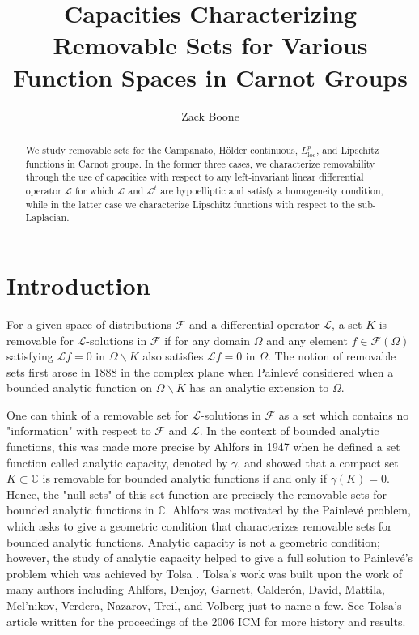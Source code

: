 \documentclass[12pt,a4paper,reqno]{amsart}
\title{Capacities Characterizing Removable Sets for Various Function Spaces in Carnot Groups}
\author{Zack Boone}
\renewcommand{\L}{\mathcal{L}}
\newcommand{\F}{\mathcal{F}}
\newcommand{\C}{\mathbb{C}}
\numberwithin{equation}{section}
\theoremstyle{definition}
\begin{document}
\begin{abstract}
We study removable sets for the Campanato, H\"{o}lder continuous, $L^p_{\text{loc}}$, and Lipschitz functions in Carnot groups. In the former three cases, we characterize removability through the use of capacities with respect to any left-invariant linear differential operator $\L$ for which $\L$ and $\L^t$ are hypoelliptic and satisfy a homogeneity condition, while in the latter case we characterize Lipschitz functions with respect to the sub-Laplacian.
\end{abstract}

\maketitle


\section{Introduction}
For a given space of distributions $\mathcal{F}$ and a differential operator $\L$, a set $K$ is removable for $\L$-solutions in $\mathcal{F}$ if for any domain $\Omega$ and any element $f \in \mathcal{F}(\Omega)$ satisfying $\L f = 0$ in $\Omega \backslash K$ also satisfies $\L f = 0$ in $\Omega$. The notion of removable sets first arose in 1888 in the complex plane when Painlev\'e considered when a bounded analytic function on $\Omega \backslash K$ has an analytic extension to $\Omega$. 

One can think of a removable set for $\L$-solutions in $\F$ as a set which contains no "information" with respect to $\mathcal{F}$ and $\L$. In the context of bounded analytic functions, this was made more precise by Ahlfors in 1947 \cite{Ah} when he defined a set function called analytic capacity, denoted by $\gamma$, and showed that a compact set $K \subset \C$ is removable for bounded analytic functions if and only if $\gamma(K) = 0$. Hence, the "null sets" of this set function are precisely the removable sets for bounded analytic functions in $\C$. Ahlfors was motivated by the Painlev\'{e} problem, which asks to give a geometric condition that characterizes removable sets for bounded analytic functions. Analytic capacity is not a geometric condition; however, the study of analytic capacity helped to give a full solution to Painlev\'{e}'s problem which was achieved by Tolsa \cite{To}. Tolsa's work \cite{To} was built upon the work of many authors including Ahlfors, Denjoy, Garnett, Calder\'{o}n, David, Mattila, Mel'nikov, Verdera, Nazarov, Treil, and Volberg just to name a few. See Tolsa's article \cite{Toref} written for the proceedings of the 2006 ICM for more history and results.
\end{document}
